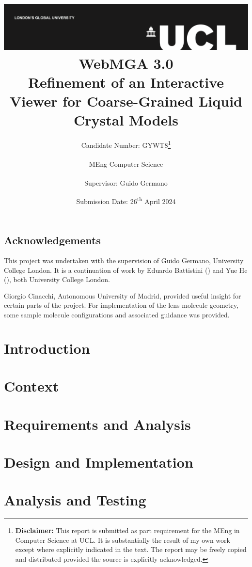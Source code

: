 \documentclass[a4paper,12pt]{report}
\title{
{\vspace{-14em} \includegraphics[width=\textwidth]{assets/images/ucl}}\\
{{\Huge WebMGA 3.0}}\\
{\large Refinement of an Interactive Viewer for Coarse-Grained Liquid Crystal Models}\\
}
\date{Submission Date: 26\textsuperscript{th} April 2024}
\author{Candidate Number: GYWT8\thanks{
{\bf Disclaimer:}
This report is submitted as part requirement for the MEng in Computer Science at UCL. It is
substantially the result of my own work except where explicitly indicated in the text. The report may be freely copied and distributed provided the source is explicitly acknowledged.}
\\ \\
MEng Computer Science\\ \\
Supervisor: Guido Germano}
\begin{document}
 
\onehalfspacing
\maketitle

\begin{abstract}

\end{abstract}

\tableofcontents

\setcounter{page}{1}
\section{Acknowledgements}
This project was undertaken with the supervision of Guido Germano, University College London. It is a continuation of work by Eduardo Battistini (\citeyear{Battistini_2021}) and Yue He (\citeyear{webmga_2}), both University College London.

Giorgio Cinacchi, Autonomous University of Madrid, provided useful insight for certain parts of the project. For implementation of the lens molecule geometry, some sample molecule configurations and associated guidance was provided.

\chapter{Introduction}


\chapter{Context}
\label{context_section}


\chapter{Requirements and Analysis}
\label{req_section}


\chapter{Design and Implementation}
\label{imp_section}








\chapter{Analysis and Testing}
\label{analysis_sec}

\end{document}
